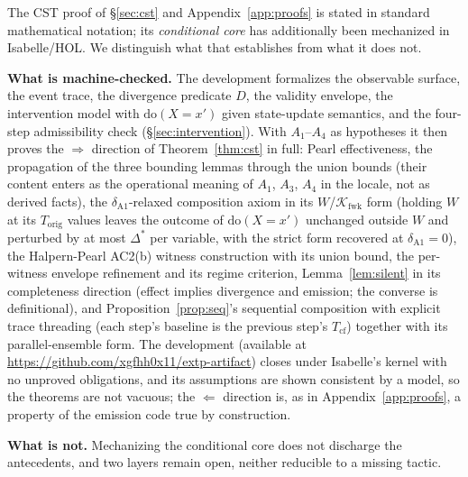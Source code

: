 \documentclass[conference]{IEEEtran}
\newcommand{\Korig}{T_\text{orig}}
\newcommand{\Tcf}{T_\text{cf}}
\newcommand{\Kfwk}{\mathcal{K}_\text{fwk}}
\newcommand{\Dstar}{\Delta^{*}}
\newcommand{\dox}[1]{\text{do}(X{=}#1)}
\newcommand{\artifacturl}{https://github.com/xgfhh0x11/extp-artifact}
\newcommand{\artifactref}{\url{\artifacturl}}
\newcommand{\artifactref}{the artifact repository; URL withheld for double-blind review}
\begin{document}
The CST proof of \S\ref{sec:cst} and Appendix~\ref{app:proofs} is
stated in standard mathematical notation; its \emph{conditional
core} has additionally been mechanized in Isabelle/HOL. We
distinguish what that establishes from what it does not.

\textbf{What is machine-checked.} The development formalizes the
observable surface, the event trace, the divergence predicate $D$,
the validity envelope, the intervention model with $\dox{x'}$ given
state-update semantics, and the four-step admissibility check
(\S\ref{sec:intervention}). With $A_1$--$A_4$ as hypotheses it then
proves the $\Rightarrow$ direction of Theorem~\ref{thm:cst} in
full: Pearl effectiveness, the propagation of the three bounding
lemmas through the union bounds (their content enters as the
operational meaning of $A_1$, $A_3$, $A_4$ in the locale, not as
derived facts), the $\delta_{\text{A1}}$-relaxed composition axiom
in its $W$/$\Kfwk$ form (holding $W$ at its $\Korig$ values leaves
the outcome of $\dox{x'}$ unchanged outside $W$ and perturbed by at
most $\Dstar$ per variable, with the strict form recovered at
$\delta_{\text{A1}}{=}0$), the Halpern-Pearl AC2(b) witness
construction with its union bound, the per-witness envelope
refinement and its regime criterion, Lemma~\ref{lem:silent} in its
completeness direction (effect implies divergence and emission; the
converse is definitional), and Proposition~\ref{prop:seq}'s sequential
composition with explicit trace threading (each step's baseline is
the previous step's $\Tcf$) together with its parallel-ensemble
form. The development
(available at \artifactref)
closes under Isabelle's kernel with no unproved obligations, and
its assumptions are shown consistent by a model, so the theorems
are not vacuous; the $\Leftarrow$ direction is, as in
Appendix~\ref{app:proofs}, a property of the emission code true by
construction.

\textbf{What is not.} Mechanizing the conditional core does not
discharge the antecedents, and two layers remain open, neither
reducible to a missing tactic.
\end{document}
